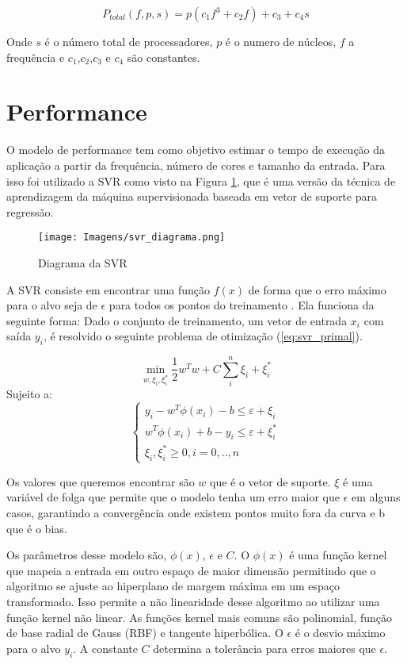\begin{equation}
P_{total}(f,p,s)= p(c_1f^3+c_2f)+c_3+c_4s \label{eq:final_cores_sock}
\end{equation}

Onde $s$ é o número total de processadores, $p$ é o numero de núcleos, $f$ a frequência e $c_1$,$c_2$,$c_3$ e $c_4$ são constantes.

\section{Performance} \label{sec:performance}

O modelo de performance tem como objetivo estimar o tempo de execução da aplicação a partir da frequência, número de cores e tamanho da entrada. Para isso foi utilizado a SVR como visto na Figura \ref{fig:svr}, que é uma versão da técnica de aprendizagem da máquina supervisionada baseada em vetor de suporte para regressão.

\begin{figure}[H]
\centering
\texttt{[image: Imagens/svr\_diagrama.png]}
\caption{Diagrama da SVR}
\label{fig:svr}
\end{figure}

A SVR \cite{Drucker1997} consiste em encontrar uma função $f(x)$ de forma que o erro máximo para o alvo seja de $\epsilon$ para todos os pontos do treinamento \cite{Smola2004}. Ela funciona da seguinte forma: Dado o conjunto de treinamento, um vetor de entrada $x_i$ com saída $y_i$, é resolvido o seguinte problema de otimização (\ref{eq:svr_primal}).

\begin{equation}
\label{eq:svr_primal}
\min_{w,\xi_i,\xi_i^*}\frac{1}{2}w^Tw+C\sum_{i}^{n}{\xi_i+\xi_i^*}
\end{equation}
Sujeito a:
\[ 
\begin{cases} 
      y_i-w^T\phi(x_i)-b \leq \varepsilon+\xi_i \\
      w^T\phi(x_i)+b-y_i \leq \varepsilon+\xi_i^* \\
      \xi_i,\xi_i^* \geq 0, i=0,..,n
\end{cases}
\]

Os valores que queremos encontrar são $w$ que é o vetor de suporte. $\xi$ é uma variável de folga que permite que o modelo tenha um erro maior que $\epsilon$ em alguns casos, garantindo a convergência onde existem pontos muito fora da curva e b que é o bias.

Os parâmetros desse modelo são, $\phi(x)$, $\epsilon$ e $C$. O $\phi(x)$ é uma função kernel que mapeia a entrada em outro espaço de maior dimensão permitindo que o algoritmo se ajuste ao hiperplano de margem máxima em um espaço transformado. Isso permite a não linearidade desse algoritmo ao utilizar uma função kernel não linear. As funções kernel mais comuns são polinomial, função de base radial de Gauss (RBF) e tangente hiperbólica. O $\epsilon$ é o desvio máximo para o alvo $y_i$. A constante $C$ determina a tolerância para erros maiores que $\epsilon$.

